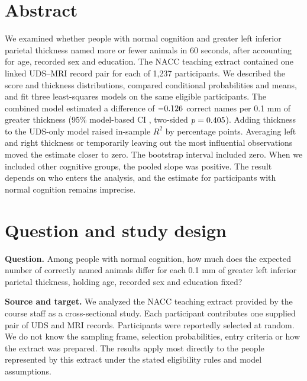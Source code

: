 \documentclass[11pt]{article}
\begin{document}
\par
\vspace{3mm}

\section{Abstract}
We examined whether people with normal cognition and greater left inferior parietal thickness named more or fewer animals in 60 seconds, after accounting for age, recorded sex and education. The NACC teaching extract contained one linked UDS--MRI record pair for each of 1,237 participants. We described the score and thickness distributions, compared conditional probabilities and means, and fit three least-squares models on the same \FinalN{} eligible participants. The combined model estimated a difference of \(-0.126\) correct names per 0.1 mm of greater thickness (95\% model-based CI \FinalCI{}, two-sided \(p=0.405\)). Adding thickness to the UDS-only model raised in-sample \(R^2\) by \MRIAddedR{} percentage points. Averaging left and right thickness or temporarily leaving out the most influential observations moved the estimate closer to zero. The bootstrap interval included zero. When we included other cognitive groups, the pooled slope was positive. The result depends on who enters the analysis, and the estimate for participants with normal cognition remains imprecise.

\section{Question and study design}
\textbf{Question.} Among people with normal cognition, how much does the expected number of correctly named animals differ for each 0.1 mm of greater left inferior parietal thickness, holding age, recorded sex and education fixed?

\textbf{Source and target.} We analyzed the NACC teaching extract provided by the course staff as a cross-sectional study. Each participant contributes one supplied pair of UDS and MRI records. Participants were reportedly selected at random. We do not know the sampling frame, selection probabilities, entry criteria or how the extract was prepared. The results apply most directly to the people represented by this extract under the stated eligibility rules and model assumptions.
\end{document}
